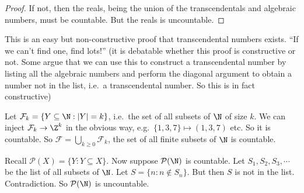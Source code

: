 \documentclass[a4paper]{article}
\begin{document}
\begin{proof}
  If not, then the reals, being the union of the transcendentals and algebraic numbers, must be countable. But the reals is uncountable.
\end{proof}
This is an easy but non-constructive proof that transcendental numbers exists. ``If we can't find one, find lots!'' (it is debatable whether this proof is constructive or not. Some argue that we can use this to construct a transcendental number by listing all the algebraic numbers and perform the diagonal argument to obtain a number not in the list, i.e.\ a transcendental number. So this is in fact constructive)

\begin{eg}
  Let $\mathcal{F}_k = \{Y\subseteq \N: |Y| = k\}$, i.e.\ the set of all subsets of $\N$ of size $k$. We can inject $\mathcal{F}_k \to \Z^k$ in the obvious way, e.g.\ $\{1, 3, 7\}\mapsto (1, 3, 7)$ etc. So it is countable. So $\mathcal{F} = \bigcup_{k\geq 0}\mathcal{F}_k$, the set of all finite subsets of $\N$ is countable.
\end{eg}

\begin{eg}
  Recall $\mathcal{P}(X) = \{Y: Y\subseteq X\}$. Now suppose $\mathcal{P}(\N)$ is countable. Let $S_1,S_2,S_3, \cdots$ be the list of all subsets of $\N$. Let $S = \{n: n\not\in S_n\}$. But then $S$ is not in the list. Contradiction. So $\mathcal{P}(\N)$ is uncountable.
\end{eg}
\end{document}
